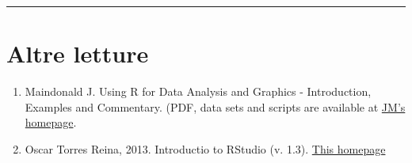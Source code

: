 \documentclass[a4paper,12pt,oneside]{book}
\providecommand{\tightlist}{%
  \setlength{\itemsep}{0pt}\setlength{\parskip}{0pt}}
\begin{document}
\begin{center}\rule{0.5\linewidth}{0.5pt}\end{center}

\hypertarget{altre-letture-12}{%
\section{Altre letture}\label{altre-letture-12}}

\begin{enumerate}
\def\labelenumi{\arabic{enumi}.}
\tightlist
\item
  Maindonald J. Using R for Data Analysis and Graphics - Introduction, Examples and Commentary. (PDF, data sets and scripts are available at \href{https://cran.r-project.org/doc/contrib/usingR.pdff}{JM's homepage}.
\item
  Oscar Torres Reina, 2013. Introductio to RStudio (v. 1.3). \href{https://dss.princeton.edu/training/RStudio101.pdf}{This homepage}
\end{enumerate}
\end{document}
